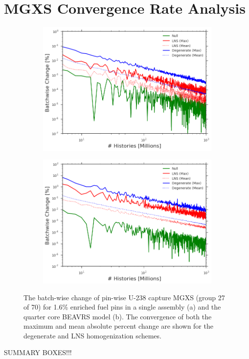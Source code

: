 \clearpage


\section{MGXS Convergence Rate Analysis}
\label{sec:chap9-convergence}

\begin{figure}[h!]
\centering
\begin{subfigure}{.87\textwidth}
  \centering
  \includegraphics[width=\linewidth]{figures/patterns/convergence/assm-16/assm-16-capt}
  \caption{}
  \label{fig:chap9-assm-16-converge}
\end{subfigure}
\begin{subfigure}{.87\textwidth}
  \centering
  \includegraphics[width=\linewidth]{figures/patterns/convergence/full-core/16-enr-capt}
  \caption{}
  \label{fig:chap9-reflector-converge}
\end{subfigure}
\caption[Convergence of pin-wise U-238 capture MGXS]{The batch-wise change of pin-wise U-238 capture \ac{MGXS} (group 27 of 70) for 1.6\% enriched fuel pins in a single assembly (a) and the quarter core \ac{BEAVRS} model (b). The convergence of both the maximum and mean absolute percent change are shown for the degenerate and \ac{LNS} homogenization schemes.}
\label{fig:chap9-converge}
\end{figure}


SUMMARY BOXES!!!
